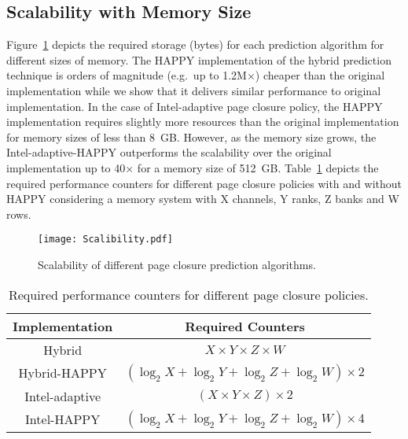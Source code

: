 \subsection{Scalability with Memory Size}



Figure~\ref{fig:Scalability_graph} depicts the required storage (bytes) for each prediction algorithm for different sizes of memory. The HAPPY implementation of the hybrid prediction technique is orders of magnitude (e.g.\ up to 1.2M$\times$) cheaper than the original implementation while we show that it delivers similar performance to original implementation. In the case of Intel-adaptive page closure policy, the HAPPY implementation requires slightly more resources than the original implementation for memory sizes of less than 8~GB. However, as the memory size grows, the Intel-adaptive-HAPPY outperforms the scalability over the original implementation up to 40$\times$ for a memory size of 512~GB. Table~\ref{table:Required_Counters_For_Each_Scheme} depicts the required performance counters for different page closure policies with and without HAPPY considering a memory system with X channels, Y ranks, Z banks and W rows.

\begin{figure}[!htb]
\centering
\texttt{[image: Scalibility.pdf]}
\caption{Scalability of different page closure prediction algorithms.}
\label{fig:Scalability_graph}
\end{figure}



\begin{table}[!htb]
\small
\centering
  \begin{tabular}{| c | c |}
	\hline
	\textbf{Implementation} & \textbf{Required Counters} \\
	\hline
	Hybrid & \(\displaystyle X\times{Y}\times{Z}\times{W} \) \\
	\hline	
	Hybrid-HAPPY & \(\displaystyle (\log_{2} X + \log_{2} Y +\log_{2} Z +\log_{2} W)\times 2 \) \\
	\hline
	Intel-adaptive & \(\displaystyle (X\times{Y}\times{Z})\times 2 \) \\
	\hline
	Intel-HAPPY & \(\displaystyle (\log_{2} X + \log_{2} Y +\log_{2} Z +\log_{2} W)\times 4 \) \\
	\hline		
  \end{tabular}
  \caption{Required performance counters for different page closure policies.}
  \label{table:Required_Counters_For_Each_Scheme}
\end{table}














